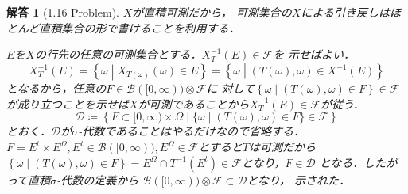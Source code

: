 \documentclass[dvipdfmx,autodetect-engine]{jsarticle}
\newtheorem*{ans}{解答}
\theoremstyle{remark}
\theoremstyle{definition}
\newcommand{\setmid}{\mathrel{} \middle| \mathrel{}}
\begin{document}
\begin{ans}[1.16 Problem]
    $X$が直積可測だから，
    可測集合の$X$による引き戻しはほとんど直積集合の形で書けることを利用する．

    $E$を$X$の行先の任意の可測集合とする．$X_{T}^{-1}(E) \in \mathcal{F}$を
    示せばよい．
    \begin{equation}
        X_{T}^{-1}(E) = \left\{\omega \setmid X_{T(\omega)}(\omega) \in E\right\}
        = \left\{ \omega \setmid (T(\omega),\omega) \in X^{-1}(E)\right\}
    \end{equation}
    となるから，任意の$F\in \mathcal{B}([0,\infty))\otimes \mathcal{F}$に
    対して$\left\{ \omega \setmid (T(\omega),\omega) \in F\right\} \in \mathcal{F}$
    が成り立つことを示せば$X$が可測であることから$X_{T}^{-1}(E) \in \mathcal{F}$が従う．
    \begin{equation}
        \mathcal{D} \coloneqq 
        \left\{ F \subset [0,\infty) \times \Omega
        \setmid \{\omega \setmid (T(\omega),\omega) \in F\}\in \mathcal{F}\right\}
    \end{equation}
    とおく．$\mathcal{D}$が$\sigma$-代数であることはやるだけなので省略する．
    $F = E^{t} \times E^{\Omega}, E^{t} \in \mathcal{B}([0,\infty)),
    E^{\Omega} \in \mathcal{F}$とすると$T$は可測だから
    $\left\{\omega \setmid (T(\omega),\omega) \in F\right\}= 
    E^{\Omega} \cap T^{-1}(E^{t}) \in \mathcal{F}$となり，$F \in \mathcal{D}$
    となる．したがって直積$\sigma$-代数の定義から
    $\mathcal{B}([0,\infty))\otimes \mathcal{F} \subset \mathcal{D}$となり，
    示された．

\end{ans}
\end{document}
